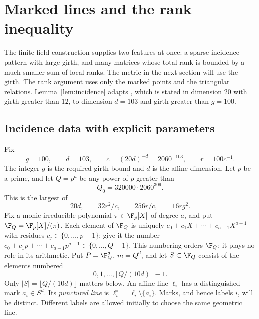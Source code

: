 \section{Marked lines and the rank inequality}\label{sec:lines}

The finite-field construction supplies two features at once: a sparse
incidence pattern with large girth, and many matrices whose total rank
is bounded by a much smaller sum of local ranks. The metric in the next
section will use the girth. The rank argument uses only the marked
points and the triangular relations.
Lemma~\ref{lem:incidence} adapts \cite[Lemma~2.2]{OAI252}, which is
stated in dimension \(20\) with girth greater than \(12\), to dimension
\(d=103\) and girth greater than \(g=100\).

\subsection{Incidence data with explicit parameters}

Fix
\begin{equation}\label{eq:constants}
 g=100,\qquad d=103,\qquad
 c=(20d)^{-d}=2060^{-103},\qquad r=100c^{-1}.
\end{equation}
The integer \(g\) is the required girth bound and \(d\) is the affine
dimension. Let \(p\) be a prime, and let \(Q=p^a\) be any power of
\(p\) greater than
\begin{equation}\label{eq:qbound}
 Q_0=320000\cdot2060^{309}.
\end{equation}
This is the largest of
\[
 20d,\qquad 32r^2/c,\qquad 256r/c,\qquad 16rg^2.
\]
Fix a monic irreducible polynomial \(\pi\in\F_p[X]\) of degree \(a\),
and put \(\F_Q=\F_p[X]/(\pi)\). Each element of \(\F_Q\) is uniquely
\(c_0+c_1X+\cdots+c_{a-1}X^{a-1}\) with residues
\(c_j\in\{0,\ldots,p-1\}\); give it the number
\(c_0+c_1p+\cdots+c_{a-1}p^{a-1}\in\{0,\ldots,Q-1\}\).
This numbering orders \(\F_Q\); it plays no role in its arithmetic.
Put \(P=\F_Q^d\), \(m=Q^d\), and let \(S\subset\F_Q\) consist of the
elements numbered
\[
 0,1,\ldots,\lfloor Q/(10d)\rfloor-1.
\]
Only \(|S|=\lfloor Q/(10d)\rfloor\) matters below.
An affine line \(\ell_i\) has a distinguished mark \(a_i\in S^d\).
Its \emph{punctured line} is \(\ell_i^\circ=\ell_i\setminus\{a_i\}\).
Marks, and hence labels \(i\), will be distinct. Different labels
are allowed initially to choose the same geometric line.


